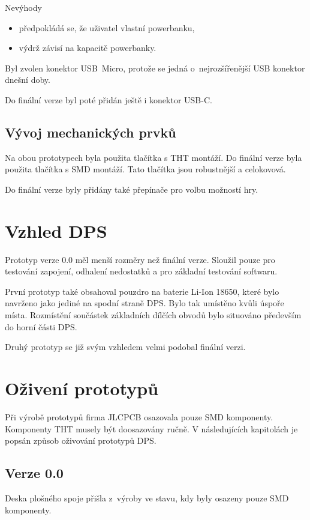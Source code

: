   Nevýhody
  \begin{itemize}
    \item předpokládá se, že uživatel vlastní powerbanku,
    \item výdrž závisí na kapacitě powerbanky. 
  \end{itemize}

  Byl zvolen konektor USB~Micro, protože se jedná o~nejrozšířenější USB konektor dnešní doby.

  Do finální verze byl poté přidán ještě i konektor USB-C.

  \subsection{Vývoj mechanických prvků}
  Na obou prototypech byla použita tlačítka s THT montáží. Do finální verze byla použita tlačítka s SMD montáží. Tato tlačítka jsou 
  robustnější a celokovová. 

  Do finální verze byly přidány také přepínače pro volbu možností hry. 

  \section{Vzhled DPS}
  Prototyp verze 0.0 měl menší rozměry než finální verze. Sloužil pouze pro testování zapojení, odhalení nedostatků a pro základní testování
  softwaru. 

  První prototyp také obsahoval pouzdro na baterie Li-Ion 18650, které bylo navrženo jako jediné na spodní straně DPS. Bylo tak umístěno
  kvůli úspoře místa. Rozmístění součástek základních dílčích obvodů bylo situováno především do horní části DPS. 

  Druhý prototyp se již svým vzhledem velmi podobal finální verzi.
  
  \section{Oživení prototypů}
  Při výrobě prototypů firma JLCPCB osazovala pouze SMD komponenty. Komponenty THT musely být doosazovány ručně. V následujících kapitolách
  je popsán způsob oživování prototypů DPS.

  \subsection{Verze 0.0}
  Deska plošného spoje přišla z~výroby ve stavu, kdy byly osazeny pouze SMD komponenty.

